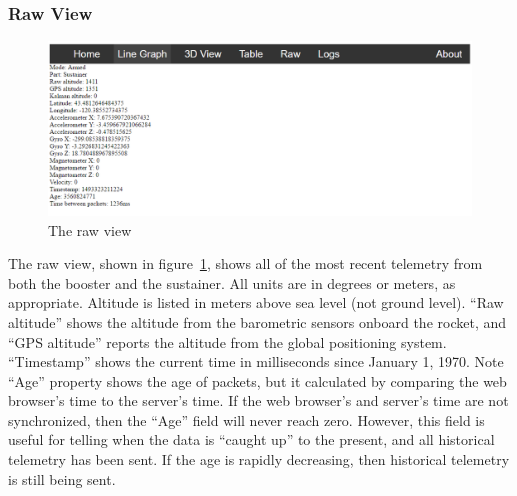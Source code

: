 \documentclass[10pt,draftclsnofoot,onecolumn]{IEEEtran}
\begin{document}
\subsubsection{Raw View}
	\begin{figure}[thbp!]
		\centering\includegraphics[width=170mm]{gs-raw}
		\caption{The raw view}
		\label{gs-raw}
	\end{figure}
The raw view, shown in figure~\ref{gs-raw}, shows all of the most recent telemetry from both the
booster and the sustainer. All units are in degrees or meters, as appropriate.
Altitude is listed in meters above sea level (not ground level).
``Raw altitude'' shows the altitude from the barometric sensors onboard the rocket,
and ``GPS altitude'' reports the altitude from the global positioning system.
``Timestamp'' shows the current time in milliseconds since January 1, 1970.
Note ``Age'' property shows the age of packets, but it calculated by comparing the
web browser's time to the server's time.
If the web browser's and server's time are not synchronized, then the ``Age'' field will
never reach zero.
However, this field is useful for telling when the data is ``caught up'' to the present,
and all historical telemetry has been sent.
If the age is rapidly decreasing, then historical telemetry is still being sent.
\end{document}
